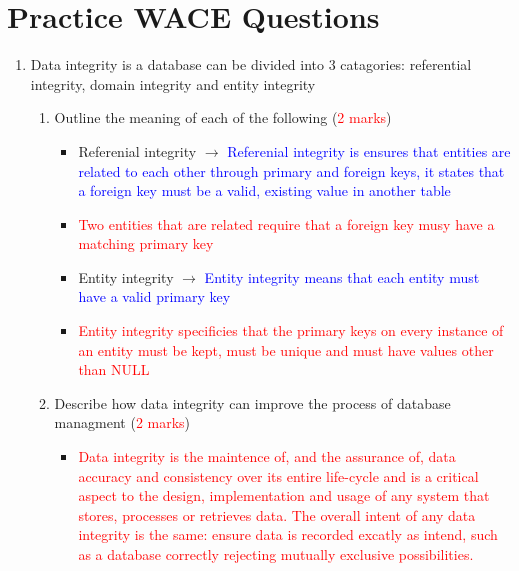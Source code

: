 \documentclass[12pt, a4, twoside]{article}
\begin{document}
\section{Practice WACE Questions}
\begin{center}
  \begin{enumerate}
    \item Data integrity is a database can be divided into 3 catagories: referential integrity, domain integrity and entity integrity
    \begin{enumerate}
      \item Outline the meaning of each of the following (\textcolor{red}{2 marks})
      \begin{itemize}
        \item Referenial integrity $\rightarrow$
        \textcolor{blue}{Referenial integrity is ensures that entities are related to each other through primary and foreign keys, it states that a foreign key must be a valid, existing value in another table}
        \item \textcolor{red}{Two entities that are related require that a foreign key musy have a matching primary key}
        \item Entity integrity $\rightarrow$
        \textcolor{blue}{Entity integrity means that each entity must have a valid primary key}
        \item \textcolor{red}{Entity integrity specificies that the primary keys on every instance of an entity must be kept, must be unique and must have values other than NULL}
      \end{itemize}
      \item Describe how data integrity can improve the process of database managment (\textcolor{red}{2 marks})
      \begin{itemize}
        \item \textcolor{red}{Data integrity is the maintence of, and the assurance of, data accuracy and consistency over its entire life-cycle and is a critical aspect to the design, implementation and usage of any system that stores, processes or retrieves data. The overall intent of any data integrity is the same: ensure data is recorded excatly as intend, such as a database correctly rejecting mutually exclusive possibilities.}
      \end{itemize}
    \end{enumerate}
  \end{enumerate}
\end{center}
\end{document}
